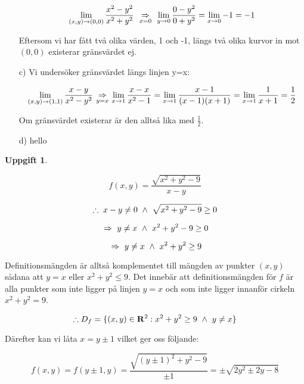 \documentclass{article}
\newtheorem{thr}{Uppgift}
\begin{document}
\begin{enumerate}
        \vskip 0.2cm

        $$
        \mathop\mathrm{lim}_{(x, y)\to(0, 0)}{\frac{x^2-y^2}{x^2+y^2}}\;
        \underset{x=0}{\ \Rightarrow \ }\;
        \mathop\mathrm{lim}_{y\to0}{\frac{0-y^2}{0+y^2}}
        =
        \mathop\mathrm{lim}_{x\to0}{-1}
        =
        -1
        $$

        \vskip 0.2cm

        Eftersom vi har fått två olika värden, 1 och -1, längs två olika kurvor in mot $(0, 0)$ existerar gränsvärdet ej. 

        \vskip 0.3cm
        
    \item[c)] Vi undersöker gränsvärdet längs linjen y=x:

        \vskip 0.1cm

        $$
        \mathop\mathrm{lim}_{(x, y)\to(1, 1)}{\frac{x-y}{x^2-y^2}}
        \underset{y=x}{\ \Rightarrow \ }
        \mathop\mathrm{lim}_{x\to1}{\frac{x-x}{x^2-1}}
        =
        \mathop\mathrm{lim}_{x\to1}{\frac{x-1}{(x-1)(x+1)}}
        =
        \mathop\mathrm{lim}_{x\to1}{\frac{1}{x+1}}
        =
        \frac{1}{2}
        $$

        \newpage

        Om gränsvärdet existerar är den alltså lika med $\frac{1}{2}$.

    \item[d)] hello

\end{enumerate}

\newpage

\begin{thr}
\end{thr}

$$
f(x, y)=\frac{\sqrt{x^2+y^2-9}}{x-y}
$$

$$
\therefore\; x-y\neq0 \ \wedge \  \sqrt{x^2+y^2-9}\geq0
$$

$$
\ \Rightarrow \ 
y\neq x \ \wedge \  x^2+y^2-9\geq0
$$

$$
\ \Rightarrow \ 
y\neq x \ \wedge \  x^2+y^2\geq9
$$

\vskip 0.2cm

Definitionsmängden är alltså komplementet till mängden av punkter $(x, y)$ sådana att $y=x$ eller $x^2+y^2\le9$. Det innebär att definitionsmängden för $f$ är alla punkter som inte ligger på linjen $y=x$ och som inte ligger innanför cirkeln $x^2+y^2=9$.

$$
\therefore D_{f}=\{(x, y)\in \mathbf{R}^2: x^2+y^2\geq9 \ \wedge \  y\neq x\}
$$

Därefter kan vi låta $x=y\pm1$ vilket ger oss följande:

$$
f(x, y)=f(y\pm1, y)=\frac{\sqrt{(y\pm1)^2+y^2-9}}{\pm1}=\pm\sqrt{2y^2\pm2y-8}
$$
\end{document}

